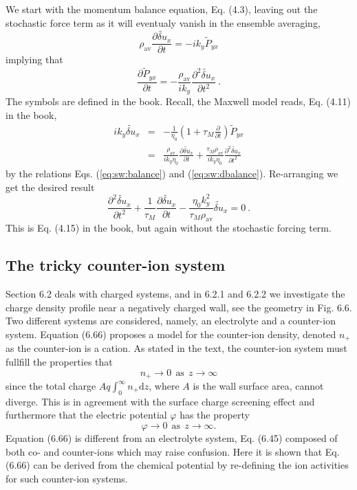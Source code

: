 \documentclass[11pt]{article}
\renewcommand{\d}{\mathrm{d}}
\begin{document}
We start with the momentum balance equation, Eq. (4.3), leaving out the stochastic force term as it will eventualy vanish in the ensemble 
averaging, 
\begin{equation}
	\label{eq:sw:balance}
	\rho_\text{av} \frac{\partial \widetilde{\delta u}_x}{\partial t} = -ik_y \widetilde{P}_{yx}
\end{equation}
implying that
\begin{equation}
	\label{eq:sw:dbalance}
	\frac{\partial \widetilde{P}_{yx}}{\partial t} = - \frac{\rho_\text{av}}{i k_y}\frac{\partial^2 \widetilde{\delta u}_x}{\partial t^2} \ .
\end{equation}
The symbols are defined in the book. Recall, the Maxwell model reads, Eq. (4.11) in the book,
\begin{eqnarray}
	ik_y \widetilde{\delta u}_x &=& - \frac{1}{\eta_0} \left(1 + \tau_M \frac{\partial}{\partial t}\right) \widetilde{P}_{yx} \\
	&=& \frac{\rho_\text{av}}{i k_y\eta_0} \frac{\partial \widetilde{\delta u}_x}{\partial t} 
	+ \frac{\tau_M \rho_\text{av}}{ik_y\eta_0}\frac{\partial^2\widetilde{\delta u}_x}{\partial t^2} 
\end{eqnarray}
by the relations Eqs. (\ref{eq:sw:balance}) and (\ref{eq:sw:dbalance}). Re-arranging we get the desired 
result
\begin{equation}
	\frac{\partial^2\widetilde{\delta u}_x}{\partial t^2} + \frac{1}{\tau_M} \frac{\partial \widetilde{\delta u}_x}{\partial t} - 
	\frac{\eta_0 k_y^2}{\tau_M \rho_\text{av}} \widetilde{\delta u}_x = 0 \ .
\end{equation}
This is Eq. (4.15) in the book, but again without the stochastic forcing term.

\subsection*{The tricky counter-ion system}
Section 6.2 deals with charged systems, and in 6.2.1 and 6.2.2 we investigate the 
charge density profile near a negatively charged wall, see the geometry in Fig. 6.6. 
Two different systems are considered, namely, an electrolyte and a counter-ion system. 
Equation (6.66) proposes a model for the counter-ion density, denoted $n_+$ as the counter-ion is 
a cation. As stated in the text, the counter-ion system must fullfill the properties that 
\begin{equation}
\label{eq:tc:n+zero}	
	n_+ \rightarrow 0 \ \ \text{as} \ \ z \rightarrow \infty
\end{equation}
since the total charge $A q\int_0^\infty n_+ \d z$, where $A$ is the wall surface area, cannot 
diverge. This is in agreement with the surface charge screening effect and furthermore
that the electric potential $\varphi$ has the property
\begin{equation}
\label{eq:tc:potential}
 \varphi \rightarrow 0 \ \ \text{as} \ \ z \rightarrow \infty.
\end{equation}
Equation (6.66) is different from an electrolyte system, Eq. (6.45) composed of both co- and 
counter-ions which may raise confusion. Here it is shown that Eq. (6.66) can be derived from the 
chemical potential by re-defining the ion activities for such counter-ion systems.
\end{document}
